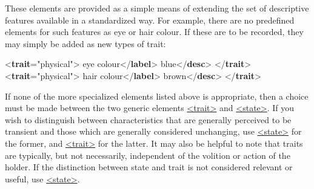 These elements are provided as a simple means of extending the set of descriptive features available in a standardized way. For example, there are no predefined elements for such features as eye or hair colour. If these are to be recorded, they may simply be added as new types of trait: \par\bgroup{}\exampleFont \begin{shaded}\noindent\mbox{}{<\textbf{trait}\hspace*{1em}{type}="{physical}">}\mbox{}\newline 
{}eye colour{</\textbf{label}>}\mbox{}\newline 
{}blue{</\textbf{desc}>}\mbox{}\newline 
{</\textbf{trait}>}\mbox{}\newline 
{<\textbf{trait}\hspace*{1em}{type}="{physical}">}\mbox{}\newline 
{}hair colour{</\textbf{label}>}\mbox{}\newline 
{}brown{</\textbf{desc}>}\mbox{}\newline 
{</\textbf{trait}>}\end{shaded}\egroup\par \par
If none of the more specialized elements listed above is appropriate, then a choice must be made between the two generic elements \hyperref[TEI.trait]{<trait>} and \hyperref[TEI.state]{<state>}. If you wish to distinguish between characteristics that are generally perceived to be transient and those which are generally considered unchanging, use \hyperref[TEI.state]{<state>} for the former, and \hyperref[TEI.trait]{<trait>} for the latter. It may also be helpful to note that traits are typically, but not necessarily, independent of the volition or action of the holder. If the distinction between state and trait is not considered relevant or useful, use \hyperref[TEI.state]{<state>}.\par
